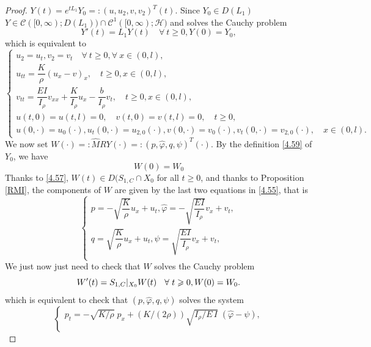 \documentclass[10pt, english]{article}
\begin{document}
{\begin{proof}
$Y(t)=e^{tL_1}Y_0=:(u,u_2,v,v_2)^T(t)$. Since  $Y_0 \in D(L_1)$ $Y \in \mathcal{C}([0,\infty); D(L_1)) \cap \mathcal{C}^1([0,\infty); \mathcal{H})$ and solves the Cauchy problem
$$
Y'(t)=L_1Y(t) \quad \forall \ t \geqslant 0, Y(0)=Y_0,
$$
which is equivalent to
\begin{equation}\label{4.60}%
\begin{cases}
u_2=u_t, v_2=v_t \quad \forall \ t \geqslant 0, \forall \ x \in (0,l),\\
u_{tt}=\dfrac{K}{\rho}(u_{x}-v)_{x},  \quad t\geqslant 0, x \in (0,l), \\[1em]
v_{tt}=\dfrac{EI}{I_{\rho }}v_{xx}+\dfrac{K}{I_{\rho }}u_{x}-\dfrac{b}{I_{\rho }}v_{t}, \quad t\geqslant 0, x \in (0,l), \\
u(t,0)=u(t,l)=0,\quad v(t,0)=v(t,l)=0, \quad t \geqslant 0,\\
u(0,\cdot)=u_0(\cdot),u_t(0,\cdot)=u_{2,0}(\cdot), v(0,\cdot)=v_0(\cdot),v_t(0,\cdot)=v_{2,0}(\cdot), \quad x \in (0,l).
\end{cases}
\end{equation}
We now set $W(\cdot)=:\widehat{M}RY(\cdot)=:(p,\widehat{\varphi}, q, \psi)^T(\cdot)$. By the definition \eqref{4.59} of $Y_0$, we have
\begin{equation}\label{4.61}%
W(0)=W_0
\end{equation}
Thanks to \eqref{4.57}, $W(t) \in D(S_{1,C} \cap X_0$ for all $t \geqslant 0$, and thanks to Proposition \ref{RMI}, the components of $W$ are given by the last two equations in \eqref{4.55}, that is
\begin{equation}\label{4.62}%
\begin{cases}
\displaystyle{p=-\sqrt{\dfrac{K}{\rho}}u_x + u_t, \widehat{\varphi}=-\sqrt{\dfrac{EI}{I_{\rho}}}v_x + v_t},\\
\displaystyle{q=\sqrt{\dfrac{K}{\rho}}u_x + u_t,
\psi=\sqrt{\dfrac{EI}{I_{\rho}}}v_x + v_t,}\\
\end{cases}
\end{equation}
We just now just need to check that $W$ solves the Cauchy problem
$$
W'(t)=S_{1,C}\small{|}_{X_0}W(t) \quad \forall \ t \geqslant 0, W(0)=W_0.
$$
which is equivalent to check that $(p,\widehat{\varphi}, q, \psi)$ solves the system
\begin{equation}\label{4.63}%
\begin{cases}
p_t=-\sqrt{K/\rho}\; p_{x} + (K/(2\rho)) \sqrt{I_{\rho}/ E\, I}\; (\widehat{\varphi}-\psi), \\

\end{cases}
\end{equation}
\end{proof}}
\end{document}
